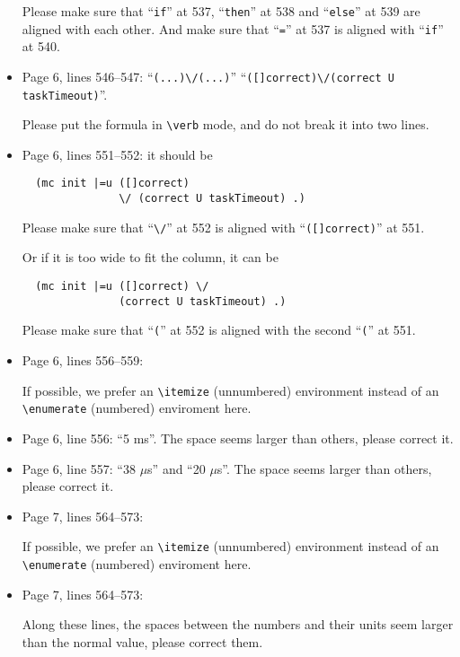 \documentclass[12pt,onecolumn]{IEEEtranTIE}
\begin{document}
\begin{itemize}
Please make sure that ``\verb|if|'' at 537, ``\verb|then|'' at 538 and
``\verb|else|'' at 539 are aligned with each other.  And make sure
that ``\verb|=|'' at 537 is aligned with ``\verb|if|'' at 540.


\item Page 6, lines 546--547: ``\verb|(...)\/(...)|'' \by
  ``\verb|([]correct)\/(correct U taskTimeout)|''.

Please put the formula in \verb|\verb| mode, and do not break it into
two lines.


\item Page 6, lines 551--552: it should be
\begin{verbatim}
  (mc init |=u ([]correct) 
               \/ (correct U taskTimeout) .)
\end{verbatim}

Please make sure that ``\verb|\/|'' at 552 is aligned with
``\verb|([]correct)|'' at 551.

Or if it is too wide to fit the column, it can be
\begin{verbatim}
  (mc init |=u ([]correct) \/ 
               (correct U taskTimeout) .)
\end{verbatim}

Please make sure that ``\verb|(|'' at 552 is aligned with the second
``\verb|(|'' at 551.


\item Page 6, lines 556--559:

If possible, we prefer an \verb|\itemize| (unnumbered) environment
instead of an \verb|\enumerate| (numbered) enviroment here.

\item Page 6, line 556: ``5 ms''. The space seems larger than others,
  please correct it.

\item Page 6, line 557: ``38 $\mu$s'' and ``20 $\mu$s''. The space
  seems larger than others, please correct it.

\item Page 7, lines 564--573:

If possible, we prefer an \verb|\itemize| (unnumbered) environment
instead of an \verb|\enumerate| (numbered) enviroment here.

\item Page 7, lines 564--573:

Along these lines, the spaces between the numbers and their units seem
larger than the normal value, please correct them.


\end{itemize}
\end{document}
